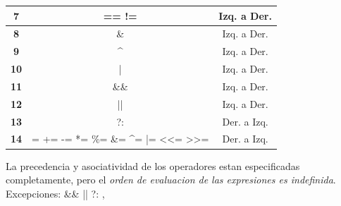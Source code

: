 \documentclass{article}
\begin{document}
\begin{table}[H]
\begin{tabular}{|c|c|c|}
    \cellcolor[HTML]{9BA3EB}\textbf{7}                                          & \cellcolor[HTML]{FFFFFF}==  !=                                                                            & \cellcolor[HTML]{EBD178}Izq. a Der. \\ \hline
    \cellcolor[HTML]{9BA3EB}\textbf{8}                                          & \cellcolor[HTML]{FFFFFF}\&                                                                                & \cellcolor[HTML]{EBD178}Izq. a Der. \\ \hline
    \cellcolor[HTML]{9BA3EB}\textbf{9}                                          & \cellcolor[HTML]{FFFFFF}\textasciicircum{}                                                                & \cellcolor[HTML]{EBD178}Izq. a Der. \\ \hline
    \cellcolor[HTML]{9BA3EB}\textbf{10}                                         & \cellcolor[HTML]{FFFFFF}|                                                                                 & \cellcolor[HTML]{EBD178}Izq. a Der. \\ \hline
    \cellcolor[HTML]{9BA3EB}\textbf{11}                                         & \&\&                                                                                                      & \cellcolor[HTML]{EBD178}Izq. a Der. \\ \hline
    \cellcolor[HTML]{9BA3EB}\textbf{12}                                         & ||                                                                                                        & \cellcolor[HTML]{EBD178}Izq. a Der. \\ \hline
    \cellcolor[HTML]{9BA3EB}\textbf{13}                                         & ?:                                                                                                        & \cellcolor[HTML]{50B0B3}Der. a Izq. \\ \hline
    \cellcolor[HTML]{9BA3EB}\textbf{14}                                         & =   +=  -=  *=  \%=  \&=  \textasciicircum{}=  |=  \textless{}\textless{}=  \textgreater{}\textgreater{}= & \cellcolor[HTML]{50B0B3}Der. a Izq. \\ \hline
    \end{tabular}
\end{table}
La precedencia y asociatividad de los operadores estan especificadas completamente, 
pero el \emph{orden de evaluacion de las expresiones es indefinida}. 
\\Excepciones: \&\&  ||  ?:  ,

\end{document}

